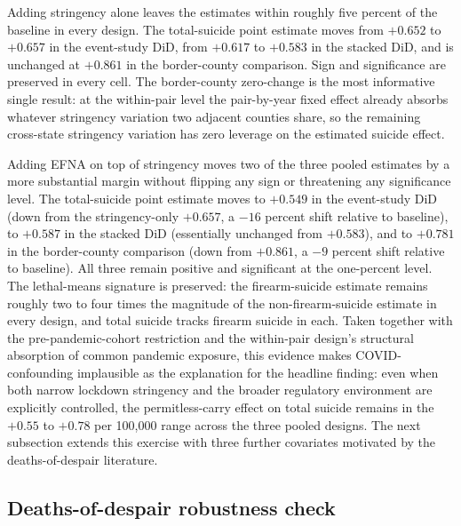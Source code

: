 \documentclass[12pt]{article}
\begin{document}
Adding stringency alone leaves the estimates within roughly five
percent of the baseline in every design. The total-suicide point
estimate moves from $+0.652$ to $+0.657$ in the event-study DiD,
from $+0.617$ to $+0.583$ in the stacked DiD, and is unchanged at
$+0.861$ in the border-county comparison. Sign and significance are
preserved in every cell. The border-county zero-change is the most
informative single result: at the within-pair level the
pair-by-year fixed effect already absorbs whatever stringency
variation two adjacent counties share, so the remaining cross-state
stringency variation has zero leverage on the estimated suicide
effect.

Adding EFNA on top of stringency moves two of the three pooled
estimates by a more substantial margin without flipping any sign or
threatening any significance level. The total-suicide point
estimate moves to $+0.549$ in the event-study DiD (down from the
stringency-only $+0.657$, a $-16$ percent shift relative to
baseline), to $+0.587$ in the stacked DiD (essentially unchanged
from $+0.583$), and to $+0.781$ in the border-county comparison
(down from $+0.861$, a $-9$ percent shift relative to baseline).
All three remain positive and significant at the one-percent level.
The lethal-means signature is preserved: the firearm-suicide
estimate remains roughly two to four times the magnitude of the
non-firearm-suicide estimate in every design, and total suicide
tracks firearm suicide in each. Taken together with the
pre-pandemic-cohort restriction and the within-pair design's
structural absorption of common pandemic exposure, this evidence
makes COVID-confounding implausible as the explanation for the
headline finding: even when both narrow lockdown stringency and
the broader regulatory environment are explicitly controlled, the
permitless-carry effect on total suicide remains in the $+0.55$
to $+0.78$ per 100,000 range across the three pooled designs.
The next subsection extends this exercise with three further
covariates motivated by the deaths-of-despair literature.

\subsection*{Deaths-of-despair robustness check}\label{sec:despairrobust}
\end{document}
